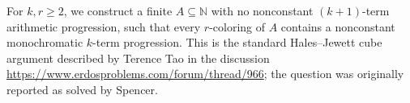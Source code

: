 For $k,r\ge2$, we construct a finite $A\subseteq\mathbb N$ with no nonconstant $(k+1)$-term arithmetic progression, such that every $r$-coloring of $A$ contains a nonconstant monochromatic $k$-term progression. This is the standard Hales--Jewett cube argument described by Terence Tao in the discussion \url{https://www.erdosproblems.com/forum/thread/966}; the question was originally reported as solved by Spencer.
